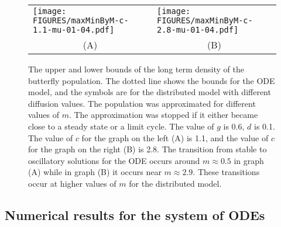 \documentclass[review,authoryear]{elsarticle}
\newcommand{\origM}{m}
\begin{document}


\begin{figure}[htb]
  \begin{tabular}{p{}p{}}
  \texttt{[image: FIGURES/maxMinByM-c-1.1-mu-01-04.pdf]} 
  &
  \texttt{[image: FIGURES/maxMinByM-c-2.8-mu-01-04.pdf]} \\
  \multicolumn{1}{c}{(A)} & 
  \multicolumn{1}{c}{(B)} \\
  \end{tabular}
  \caption[Upper and lower bounds of the butterfly density.]{The  upper
    and lower bounds of the long term density of the butterfly
    population. The dotted line shows the bounds for the ODE model, and the symbols are for the distributed model with different diffusion values. The population was approximated for different values
    of $\origM$. The approximation was stopped if it either became close to
    a steady state or a limit cycle.  The value of $g$ is 0.6, $d$ is 0.1. The value of $c$ for the graph on the left (A) is 1.1, and the value of $c$ for the graph on the right (B) is 2.8. The transition from stable to oscillatory solutions for the ODE occurs around $m\approx 0.5$ in graph (A) while in graph (B) it occurs near $m\approx 2.9$.   These transitions occur at higher values of $m$ for the distributed model.}
  \label{fig:odepdeButterflyMaxMin}
\end{figure}






\subsection{Numerical results for the system of ODEs}
\label{subsection:odeApproximation}
\end{document}
